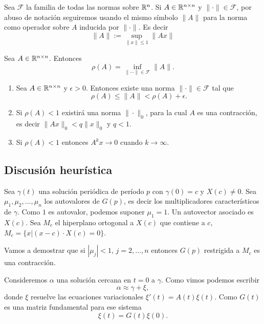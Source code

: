 Sea $\mathcal{F}$ la familia de todas las normas sobre $\mathbb{R}^n$. Si $A\in\mathbb{R}^{n\times n}$ y $\|\cdot \|\in\mathcal{F}$, 
por abuso de notación seguiremos usando el mismo símbolo $\|A\|$ para la norma como operador sobre $A$ inducida por 
$\|\cdot\|$. Es decir
\[\|A\|:=\sup_{\|x\|\leq 1} \|Ax\|\]


\begin{teorema}{}



  Sea $A\in\mathbb{R}^{n\times n}$. Entonces
\[  \rho(A)=\inf_{\|\cdots\|\in\mathcal{F}}\|A \|. \]

\end{teorema}

\begin{corolario}{}





\begin{enumerate}
 \item Sea $A\in\mathbb{R}^{n\times n}$ y $\epsilon>0$. Entonces existe una norma $\| \cdot\|\in\mathcal{F}$ tal que
\[  \rho(A)\leq \|A\|<\rho(A)+\epsilon.\]
\item Si $\rho(A)<1$ existirá una norma $\|\cdot\|_0$, para la cual $A$ es una contracción, es decir $\|Ax\|_0<q\|x\|_0$ y $q<1$. 

\item Si $\rho(A)<1$ entonces $A^kx\to 0$ cuando $k\to\infty$.
\end{enumerate}

\end{corolario}

 

\subsection{Discusión heurística}
Sea $\gamma(t)$ una solución periódica de período $p$ con $\gamma(0)=c$ y $X(c)\neq 0$. Sea $\mu_1,\mu_2,\dots,\mu_n$ los autovalores de $G(p)$, 
es decir los
multiplicadores característicos de $\gamma$. Como $1$ es autovalor, podemos suponer $\mu_1=1$. Un autovector asociado es $X(c)$. Sea $M_c$ el hiperplano ortogonal a $X(c)$
que contiene a $c$, $M_c=\{x|(x-c)\cdot X(c)=0\}$. 

Vamos a demostrar  que si $|\mu_j|<1$, $j=2,\ldots,n$ entonces $G(p)$ restrigida a $M_c$ es una contracción.

Consideremos $\alpha$ una solución cercana en $t=0$ a $\gamma$. Como vimos podemos escribir 
\begin{equation}\label{ecuaaprox}
 \alpha\approx \gamma+\xi,
\end{equation}
 donde $\xi$ resuelve las ecuaciones 
variacionales $\xi'(t)=A(t)\xi(t)$. Como $G(t)$ es una matriz fundamental para ese sistema 
\begin{equation}\label{ecuavar}
 \xi(t)=G(t)\xi(0). 
\end{equation}





